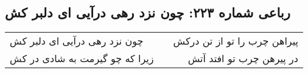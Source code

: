 \begin{center}
\section*{رباعی شماره ۲۲۳: چون نزد رهی درآیی ای دلبر کش}
\label{sec:sh223}
\begin{longtable}{l p{0.5cm} r}
چون نزد رهی درآیی ای دلبر کش
&&
پیراهن چرب را تو از تن درکش
\\
زیرا که چو گیرمت به شادی در کش
&&
در پیرهن چرب تو افتد آتش
\\
\end{longtable}
\end{center}
